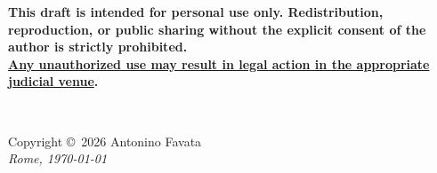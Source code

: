 \documentclass[11pt,fleqn]{book} %
\begin{document}
\begin{tcolorbox}[colback=gray!10, colframe=black, boxrule=0.4pt, arc=2mm, width=\textwidth, left=5pt, right=5pt, top=5pt, bottom=5pt]
	\small
	\textbf{This draft is intended for personal use only. Redistribution, reproduction, or public sharing without the explicit consent of the author is strictly prohibited.\\ 
		\underline{Any unauthorized use may result in legal action in the appropriate judicial venue}.}
\end{tcolorbox}
\vspace*{\fill}
~\vfill
\thispagestyle{empty}

\noindent Copyright \copyright\ 2026 Antonino Favata\\ %




\noindent \textit{Rome, \today} %
%
%
\newpage\thispagestyle{empty}
\end{document}
